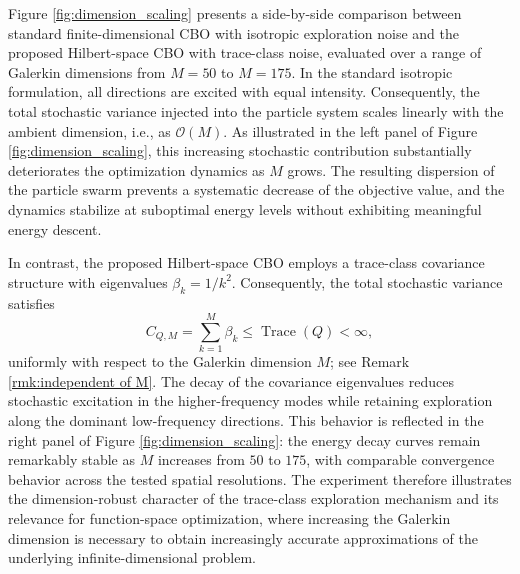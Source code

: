 \documentclass[12pt]{amsart}
\numberwithin{equation}{section}
\begin{document}
Figure \ref{fig:dimension_scaling} presents a side-by-side comparison between standard finite-dimensional CBO with isotropic exploration noise and the proposed Hilbert-space CBO with trace-class noise, evaluated over a range of Galerkin dimensions from $M=50$ to $M=175$. In the standard isotropic formulation, all directions are excited with equal intensity. Consequently, the total stochastic variance injected into the particle system scales linearly with the ambient dimension, i.e., as $\mathcal{O}(M)$. As illustrated in the left panel of Figure \ref{fig:dimension_scaling}, this increasing stochastic contribution substantially deteriorates the optimization dynamics as $M$ grows. The resulting dispersion of the particle swarm prevents a systematic decrease of the objective value, and the dynamics stabilize at suboptimal energy levels without exhibiting meaningful energy descent.

In contrast, the proposed Hilbert-space CBO employs a trace-class covariance structure with eigenvalues $\beta_k=1/k^2$. Consequently, the total stochastic variance satisfies
\begin{equation*}
    C_{Q,M}=\sum_{k=1}^M\beta_k\leq\operatorname{Trace}(Q)<\infty,
\end{equation*}
uniformly with respect to the Galerkin dimension $M$; see Remark \ref{rmk:independent of M}. The decay of the covariance eigenvalues reduces stochastic excitation in the higher-frequency modes while retaining exploration along the dominant low-frequency directions. This behavior is reflected in the right panel of Figure \ref{fig:dimension_scaling}: the energy decay curves remain remarkably stable as $M$ increases from $50$ to $175$, with comparable convergence behavior across the tested spatial resolutions. The experiment therefore illustrates the dimension-robust character of the trace-class exploration mechanism and its relevance for function-space optimization, where increasing the Galerkin dimension is necessary to obtain increasingly accurate approximations of the underlying infinite-dimensional problem.

\end{document}
